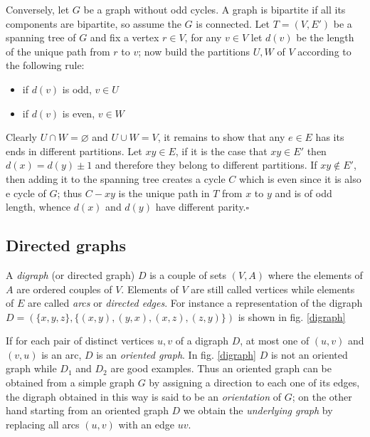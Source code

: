 \documentclass[a4paper,12pt,twoside]{book}
\newcommand*{\QED}{\hfill\ensuremath{\square}}
\let\emptyset\varnothing
\begin{document}
Conversely, let $G$ be a graph without odd cycles. A graph is bipartite if all its components are bipartite, so assume the $G$ is connected. Let $T=(V,E')$ be a spanning tree of $G$ and fix a vertex $r\in V$, for any $v\in V$ let $d(v)$ be the length of the unique path from $r$ to $v$; now build the partitions $U,W$ of $V$ according to the following rule:
\begin{itemize}
\item if $d(v)$ is odd, $v\in U$
\item if $d(v)$ is even, $v\in W$
\end{itemize} 
Clearly $U\cap W =\emptyset$ and $U\cup W=V$, it remains to show that any $e\in E$ has its ends in different partitions. 
Let $xy\in E$, if it is the case that $xy\in E'$ then $d(x)=d(y)\pm 1$ and therefore they belong to different partitions. If $xy\notin E'$, then adding it to the spanning tree creates a cycle $C$ which is even since it is also e cycle of $G$; thus $C-xy$ is the unique path in $T$ from $x$ to $y$ and is of odd length, whence $d(x)$ and $d(y)$ have different parity.\QED

\subsection*{Directed graphs}

A \textit{digraph} (or directed graph) $D$  is a couple of sets $(V,A)$ where the elements of $A$ are ordered couples of $V$. Elements of $V$ are still called vertices while elements of $E$ are called \textit{arcs} or \textit{directed edges}. For instance a representation of the digraph $D=(\{x,y,z\}, \{(x,y),(y,x),(x,z),(z,y)\})$ is shown in fig. \ref{digraph}

If for each pair of distinct vertices $u,v$ of a digraph $D$, at most one of $(u,v)$ and $(v,u)$ is an arc, $D$ is an \textit{oriented graph}. In fig. \ref{digraph} $D$ is not an oriented graph while $D_1$ and $D_2$ are good examples. Thus an oriented graph can be obtained from a simple graph $G$ by assigning a direction to each one of its edges, the digraph obtained in this way is said to be an \textit{orientation} of $G$; on the other hand starting from an oriented graph $D$ we obtain the \textit{underlying graph } by replacing all arcs $(u,v)$ with an edge $uv$. 
\end{document}
